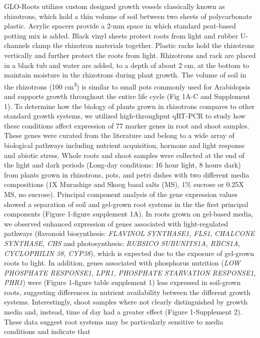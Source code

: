 \documentclass[]{article}
\begin{document}
GLO-Roots utilizes custom designed growth vessels classically known as
rhizotrons, which hold a thin volume of soil between two sheets of
polycarbonate plastic. Acrylic spacers provide a 2-mm space in which
standard peat-based potting mix is added. Black vinyl sheets protect
roots from light and rubber U-channels clamp the rhizotron materials
together. Plastic racks hold the rhizotrons vertically and further
protect the roots from light. Rhizotrons and rack are placed in a black
tub and water are added, to a depth of about 2 cm, at the bottom to
maintain moisture in the rhizotrons during plant growth. The volume of
soil in the rhizotrons (100 cm\textsuperscript{3}) is similar to small
pots commonly used for Arabidopsis and supports growth throughout the
entire life cycle (Fig 1A-C and Supplement 1). To determine how the
biology of plants grown in rhizotrons compares to other standard growth
systems, we utilized high-throughput qRT-PCR to study how these
conditions affect expression of 77 marker genes in root and shoot
samples. These genes were curated from the literature and belong to a
wide array of biological pathways including nutrient acquisition,
hormone and light response and abiotic stress. Whole roots and shoot
samples were collected at the end of the light and dark periods
(Long-day conditions: 16 hour light, 8 hours dark) from plants grown in
rhizotrons, pots, and petri dishes with two different media compositions
(1X Murashige and Skoog basal salts (MS), 1\% sucrose or 0.25X MS, no
sucrose). Principal component analysis of the gene expression values
showed a separation of soil and gel-grown root systems in the the first
principal components (Figure 1-figure supplement 1A). In roots grown on
gel-based media, we observed enhanced expression of genes associated
with light-regulated pathways (flavonoid biosynthesis: \emph{FLAVINOL
SYNTHASE1, FLS1}, \emph{CHALCONE SYNTHASE, CHS} and photosynthesis:
\emph{RUBSICO SUBUNITS1A, RBCS1A}, \emph{CYCLOPHILIN 38, CYP38}), which
is expected due to the exposure of gel-grown roots to light. In
addition, genes associated with phosphorus nutrition (\emph{LOW
PHOSPHATE RESPONSE1}, \emph{LPR1, PHOSPHATE STARVATION RESPONSE1, PHR1})
were (Figure 1-figure table supplement 1) less expressed in soil-grown
roots, suggesting differences in nutrient availability between the
different growth systems. Interestingly, shoot samples where not clearly
distinguished by growth media and, instead, time of day had a greater
effect (Figure 1-Supplement 2). These data suggest root systems may be
particularly sensitive to media conditions and indicate that
\end{document}
